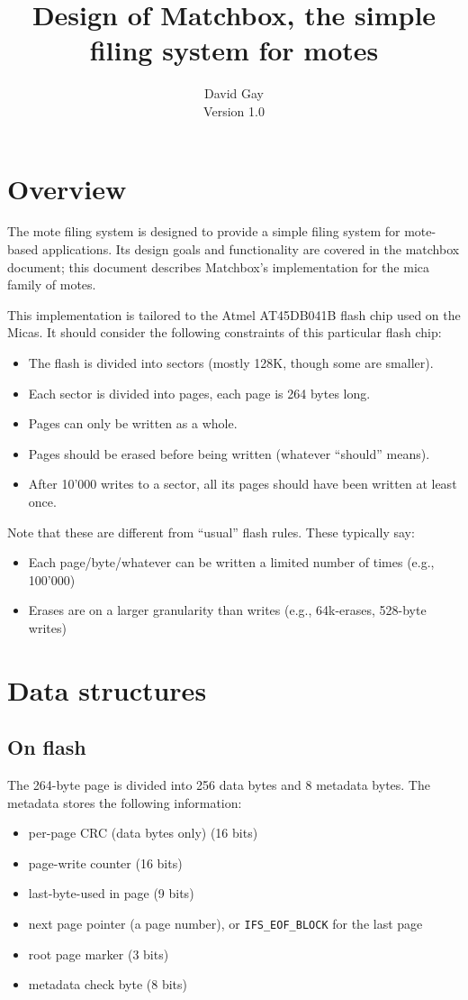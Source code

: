 \documentclass{article}
\title{Design of Matchbox, the simple filing system for motes}
\author{David Gay \\
Version 1.0}
\newcommand{\kw}[1]{\mbox{\tt #1}}
\begin{document}
  
\maketitle

\section{Overview}

The mote filing system is designed to provide a simple filing system for
mote-based applications. Its design goals and functionality are covered
in the matchbox document; this document describes Matchbox's implementation
for the mica family of motes.

This implementation is tailored to the Atmel AT45DB041B flash chip used
on the Micas. It should consider the following constraints of this 
particular flash chip:
\begin{itemize}
\item The flash is divided into sectors (mostly 128K, though some are smaller).
\item Each sector is divided into pages, each page is 264 bytes long. 
\item Pages can only be written as a whole.
\item Pages should be erased before being written (whatever ``should'' means).
\item After 10'000 writes to a sector, all its pages should have been
written at least once.
\end{itemize}

Note that these are different from ``usual'' flash rules. These typically say:
\begin{itemize}
\item Each page/byte/whatever can be written a limited number of times (e.g.,
100'000)
\item Erases are on a larger granularity than writes (e.g., 64k-erases, 
528-byte writes)
\end{itemize}

\section{Data structures}

\subsection{On flash} 

The 264-byte page is divided into 256 data bytes and 8 metadata bytes.
The metadata stores the following information:
\begin{itemize}
\item per-page CRC (data bytes only) (16 bits)
\item page-write counter (16 bits)
\item last-byte-used in page (9 bits)
\item next page pointer (a page number), or \kw{IFS\_EOF\_BLOCK} for
the last page
\item root page marker (3 bits)
\item metadata check byte (8 bits)
\end{itemize}
\end{document}
